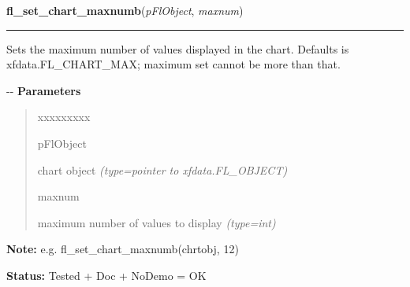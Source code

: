 \hspace{.8\funcindent}\begin{boxedminipage}{\funcwidth}

    \raggedright \textbf{fl\_set\_chart\_maxnumb}(\textit{pFlObject}, \textit{maxnum})

    \vspace{-1.5ex}

    \rule{\textwidth}{0.5\fboxrule}
\setlength{\parskip}{2ex}

Sets the maximum number of values displayed in the chart. Defaults
is xfdata.FL\_CHART\_MAX; maximum set cannot be more than that.

-{}-
\setlength{\parskip}{1ex}
      \textbf{Parameters}
      \vspace{-1ex}

      \begin{quote}
        \begin{Ventry}{xxxxxxxxx}

          \item[pFlObject]


chart object
            {\it (type=pointer to xfdata.FL\_OBJECT)}

          \item[maxnum]


maximum number of values to display
            {\it (type=int)}

        \end{Ventry}

      \end{quote}

\textbf{Note:} 
e.g. fl\_set\_chart\_maxnumb(chrtobj, 12)


\textbf{Status:} 
Tested + Doc + NoDemo = OK


    \end{boxedminipage}

    \label{xformslib:flchart:fl_set_chart_autosize}

    \vspace{0.5ex}

